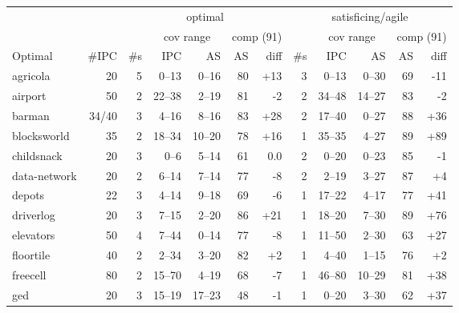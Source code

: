 \documentclass{article}
\begin{document}
            \begin{table} \centering
            \begin{tabular}{l@{}rr|rrrr|r|rrrr}
& & \multicolumn{5}{c}{optimal} & \multicolumn{5}{c}{satisficing/agile} \\

& & & \multicolumn{2}{c}{cov range} & \multicolumn{2}{c}{comp (91)} & & \multicolumn{2}{c}{cov range} & \multicolumn{2}{c}{comp (91)} \\

      Optimal & \#IPC & \#s &     IPC &     AS & AS &              diff & \#s &      IPC &     AS & AS &              diff \\
\midrule
     agricola &    20 &   5 &   0--13 &  0--16 & 80 & {\color{blue}+13} &   3 &    0--13 &  0--30 & 69 &  {\color{red}-11} \\
      airport &    50 &   2 &  22--38 &  2--19 & 81 &   {\color{red}-2} &   2 &   34--48 & 14--27 & 83 &   {\color{red}-2} \\
       barman & 34/40 &   3 &   4--16 &  8--16 & 83 & {\color{blue}+28} &   2 &   17--40 &  0--27 & 88 & {\color{blue}+36} \\
  blocksworld &    35 &   2 &  18--34 & 10--20 & 78 & {\color{blue}+16} &   1 &   35--35 &  4--27 & 89 & {\color{blue}+89} \\
   childsnack &    20 &   3 &    0--6 &  5--14 & 61 &               0.0 &   2 &    0--20 &  0--23 & 85 &   {\color{red}-1} \\
 data-network &    20 &   2 &   6--14 &  7--14 & 77 &   {\color{red}-8} &   2 &    2--19 &  3--27 & 87 &  {\color{blue}+4} \\
       depots &    22 &   3 &   4--14 &  9--18 & 69 &   {\color{red}-6} &   1 &   17--22 &  4--17 & 77 & {\color{blue}+41} \\
    driverlog &    20 &   3 &   7--15 &  2--20 & 86 & {\color{blue}+21} &   1 &   18--20 &  7--30 & 89 & {\color{blue}+76} \\
    elevators &    50 &   4 &   7--44 &  0--14 & 77 &   {\color{red}-8} &   1 &   11--50 &  2--30 & 63 & {\color{blue}+27} \\
    floortile &    40 &   2 &   2--34 &  3--20 & 82 &  {\color{blue}+2} &   1 &    4--40 &  1--15 & 76 &  {\color{blue}+2} \\
     freecell &    80 &   2 &  15--70 &  4--19 & 68 &   {\color{red}-7} &   1 &   46--80 & 10--29 & 81 & {\color{blue}+38} \\
          ged &    20 &   3 &  15--19 & 17--23 & 48 &   {\color{red}-1} &   1 &    0--20 &  3--30 & 62 & {\color{blue}+37} \\

\end{tabular}
\end{table}
\end{document}
